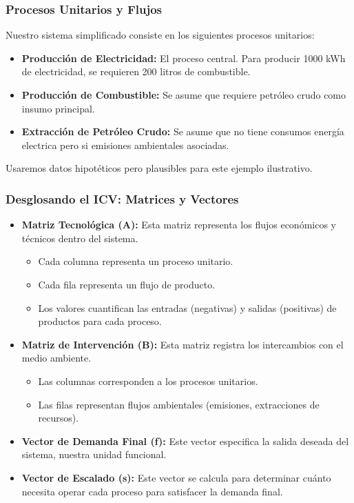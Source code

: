 \documentclass{beamer}
\begin{document}
\begin{frame}
  \frametitle{Procesos Unitarios y Flujos}
  Nuestro sistema simplificado consiste en los siguientes procesos unitarios:
  \begin{itemize}
    \item[1] \textbf{Producción de Electricidad:} El proceso central. Para producir 1000 kWh de electricidad, se requieren 200 litros de combustible.
    \item[2] \textbf{Producción de Combustible:} Se asume que requiere petróleo crudo como insumo principal.
    \item[3] \textbf{Extracción de Petróleo Crudo:} Se asume que no tiene consumos energía electrica pero si emisiones ambientales asociadas.
  \end{itemize}
  Usaremos datos hipotéticos pero plausibles para este ejemplo ilustrativo.
\end{frame}

\begin{frame}
  \frametitle{Desglosando el ICV: Matrices y Vectores}
  \begin{itemize}
    \item \textbf{Matriz Tecnológica (A):} Esta matriz representa los flujos económicos y técnicos dentro del sistema.
    \begin{itemize}
      \item Cada columna representa un proceso unitario.
      \item Cada fila representa un flujo de producto.
      \item Los valores cuantifican las entradas (negativas) y salidas (positivas) de productos para cada proceso.
    \end{itemize}
    \item \textbf{Matriz de Intervención (B):} Esta matriz registra los intercambios con el medio ambiente.
    \begin{itemize}
      \item Las columnas corresponden a los procesos unitarios.
      \item Las filas representan flujos ambientales (emisiones, extracciones de recursos).
    \end{itemize}
    \item \textbf{Vector de Demanda Final (f):} Este vector especifica la salida deseada del sistema, nuestra unidad funcional.
    \item \textbf{Vector de Escalado (s):} Este vector se calcula para determinar cuánto necesita operar cada proceso para satisfacer la demanda final.
  \end{itemize}
\end{frame}
\end{document}
